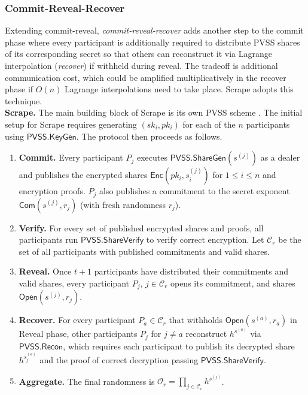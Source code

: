 \documentclass[conference]{IEEEtran}
\theoremstyle{definition}
\theoremstyle{remark}
\begin{document}
\subsubsection{Commit-Reveal-Recover}
Extending commit-reveal, \textit{commit-reveal-recover} adds another step to the commit phase where every participant is additionally required to distribute PVSS shares of its corresponding secret so that others can reconstruct it via Lagrange interpolation (\textit{recover}) if withheld during reveal. The tradeoff is additional communication cost, which could be amplified multiplicatively in the recover phase if $O(n)$ Lagrange interpolations need to take place. Scrape \cite{cascudo2017scrape} adopts this technique.\\

\noindent\textbf{Scrape.} The main building block of Scrape is its own PVSS scheme \cite{cascudo2017scrape}. The initial setup for Scrape requires generating $(sk_i, pk_i)$ for each of the $n$ participants using $\mathsf{PVSS.KeyGen}$. The protocol then proceeds as follows.
\begin{enumerate}
\item \textbf{Commit.} Every participant $P_j$ executes $\mathsf{PVSS.ShareGen}(s^{(j)})$ as a dealer and publishes the encrypted shares $\mathsf{Enc}(pk_i, s^{(j)}_i)$ for $1 \le i \le n$ and encryption proofs. $P_j$ also publishes a commitment to the secret exponent $\mathsf{Com}(s^{(j)}, r_j)$ (with fresh randomness $r_j$).
\item \textbf{Verify.} For every set of published encrypted shares and proofs, all participants run $\mathsf{PVSS.ShareVerify}$ to verify correct encryption. Let $\mathcal{C}_r$ be the set of all participants with published commitments and valid shares.
\item \textbf{Reveal.} Once $t + 1$ participants have distributed their commitments and valid shares, every participant $P_j$, $j \in \mathcal{C}_r$ opens its commitment, and shares $\mathsf{Open}(s^{(j)}, r_j)$.
\item \textbf{Recover.} For every participant $P_a \in \mathcal{C}_r$ that withholds $\mathsf{Open}(s^{(a)}, r_a)$ in Reveal phase, other participants $P_j$ for $j \neq a$ reconstruct $h^{s^{(a)}}$ via $\mathsf{PVSS.Recon}$, which requires each participant to publish its decrypted share $h^{s_j^{(a)}}$ and the proof of correct decryption passing $\mathsf{PVSS.ShareVerify}$.
\item \textbf{Aggregate.} The final randomness is $\mathcal{O}_r = \prod_{j \in \mathcal{C}_r} h^{s^{(j)}}$.
\end{enumerate}
\end{document}
